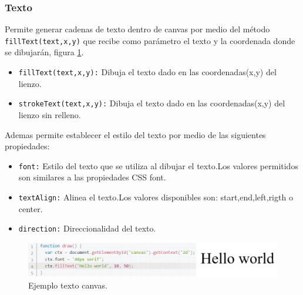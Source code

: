 \subsubsection*{Texto}
Permite generar cadenas de texto dentro de canvas por medio del método \texttt{fillText(text,x,y)} que recibe como parámetro el texto y la coordenada donde se dibujarán, figura \ref{fig:Texto_Canvas}.
\begin{itemize}
\item \texttt{fillText(text,x,y):} Dibuja el texto dado en las coordenadas(x,y) del lienzo.
\item \texttt{strokeText(text,x,y):} Dibuja el texto dado en las coordenadas(x,y) del lienzo sin relleno.
\end{itemize}
Ademas permite establecer el estilo del texto por medio de las siguientes propiedades:
\begin{itemize}
\item \texttt{font:} Estilo del texto que se utiliza al dibujar el texto.Los valores permitidos son similares a las propiedades CSS font.
\item \texttt{textAlign:} Alinea el texto.Los valores disponibles son: start,end,left,rigth o center.
\item \texttt{direction:} Direccionalidad del texto.
\end{itemize}
\begin{figure}[!h]
\begin{center}
   \includegraphics[width=0.8\linewidth]{Figures/Texto_Canvas}
  \decoRule
  \caption[Ejemplo texto canvas]{Ejemplo texto canvas.}
\label{fig:Texto_Canvas}
\end{center}
\end{figure}
